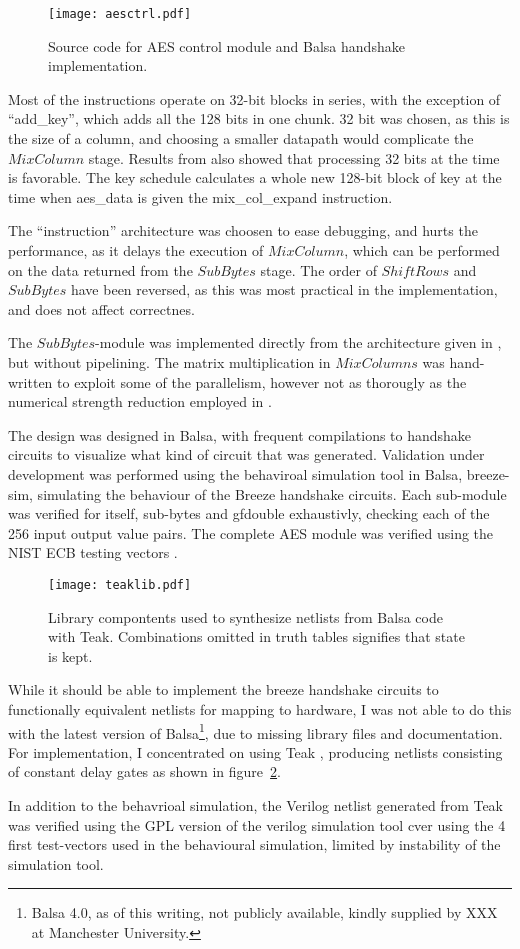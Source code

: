 \begin{figure}[htbp]
  \centering
  \texttt{[image: aesctrl.pdf]}
  \caption{Source code for AES control module and Balsa handshake
    implementation.}
  \label{fig:aesctrl}
\end{figure}

Most of the instructions operate on 32-bit blocks in series, with the
exception of ``add\_key'', which adds all the 128 bits in one
chunk. 32 bit was chosen, as this is the size of a column, and
choosing a smaller datapath would complicate the $MixColumn$
stage. Results from \cite{ekelund} also showed that processing 32 bits
at the time is favorable.  The key schedule calculates a whole new
128-bit block of key at the time when aes\_data is given the
mix\_col\_expand instruction.

The ``instruction'' architecture was choosen to ease debugging, and
hurts the performance, as it delays the execution of $MixColumn$,
which can be performed on the data returned from the $SubBytes$
stage. The order of $ShiftRows$ and $SubBytes$ have been reversed, as
this was most practical in the implementation, and does not affect
correctnes.


The $SubBytes$-module was implemented directly from the architecture
given in \cite{csbox}, but without pipelining. The matrix
multiplication in $MixColumns$ was hand-written to exploit some of the
parallelism, however not as thorougly as the numerical strength
reduction employed in \cite[pp. 20-23]{ekelund}.

The design was designed in Balsa, with frequent compilations to
handshake circuits to visualize what kind of circuit that was
generated. Validation under development was performed using the
behaviroal simulation tool in Balsa, breeze-sim, simulating the
behaviour of the Breeze handshake circuits. Each sub-module was
verified for itself, sub-bytes and gfdouble exhaustivly, checking each
of the 256 input output value pairs. The complete AES module was
verified using the NIST ECB testing vectors \cite{nisttest}.

\begin{figure}[htbp]
  \centering
  \texttt{[image: teaklib.pdf]}
  \caption{Library compontents used to synthesize netlists from Balsa
    code with Teak. Combinations omitted in truth tables signifies
    that state is kept.}
  \label{fig:teaklib}
\end{figure}

While it should be able to implement the breeze handshake circuits to
functionally equivalent netlists for mapping to hardware, I was not
able to do this with the latest version of Balsa\footnote{Balsa 4.0,
  as of this writing, not publicly available, kindly supplied by XXX
  at Manchester University.}, due to missing library files and
documentation. For implementation, I concentrated on using Teak
\cite{teak}, producing netlists consisting of constant delay gates as
shown in figure~\ref{fig:teaklib}.

In addition to the behavrioal simulation, the Verilog netlist
generated from Teak was verified using the GPL version of the verilog
simulation tool cver using the 4 first test-vectors used in the
behavioural simulation, limited by instability of the simulation tool.
